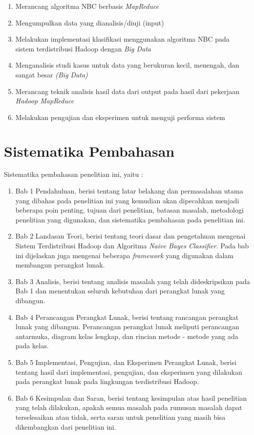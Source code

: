 \begin{enumerate}
		\item Merancang algoritma NBC berbasis \textit{MapReduce} 
		\item Mengumpulkan data yang dianalisis/diuji (input)
		\item Melakukan implementasi klasifikasi menggunakan algoritma NBC pada sistem terdistribusi Hadoop dengan \textit{Big Data}
		\item Menganalisis studi kasus untuk data yang berukuran kecil, menengah, dan sangat besar \textit{(Big Data)}
		\item Merancang teknik analisis hasil data dari output pada hasil dari pekerjaan {\it Hadoop MapReduce}
		\item Melakukan pengujian dan eksperimen untuk menguji performa sistem
\end{enumerate}


\section{Sistematika Pembahasan}

Sistematika pembahasan penelitian ini, yaitu :

\begin{enumerate}
	\item Bab 1 Pendahuluan, berisi tentang latar belakang dan permasalahan utama yang dibahas pada penelitian ini yang kemudian akan dipecahkan menjadi beberapa poin penting, tujuan dari penelitian, batasan masalah, metodologi penelitian yang digunakan, dan sistematika pembahasan pada penelitian ini. 
	\item Bab 2 Landasan Teori, berisi tentang teori dasar dan pengetahuan mengenai Sistem Terdistribusi Hadoop dan Algoritma \textit{Naive Bayes Classifier}. Pada bab ini dijelaskan juga mengenai beberapa \textit{framework} yang digunakan dalam membangun perangkat lunak.
	\item Bab 3 Analisis, berisi tentang analisis masalah yang telah dideskripsikan pada Bab 1 dan menentukan seluruh kebutuhan dari perangkat lunak yang dibangun.
	\item Bab 4 Perancangan Perangkat Lunak, berisi tentang rancangan perangkat lunak yang dibangun. Perancangan perangkat lunak meliputi perancangan antarmuka, diagram kelas lengkap, dan rincian metode - metode yang ada pada kelas.
	\item Bab 5 Implementasi, Pengujian, dan Eksperimen Perangkat Lunak, berisi tentang hasil dari implementasi, pengujian, dan eksperimen yang dilakukan pada perangkat lunak pada lingkungan terdistribusi Hadoop.
	\item Bab 6 Kesimpulan dan Saran, berisi tentang kesimpulan atas hasil penelitian yang telah dilakukan, apakah semua masalah pada rumusan masalah dapat terselesaikan atau tidak, serta saran untuk penelitian yang masih bisa dikembangkan dari penelitian ini.
\end{enumerate}
